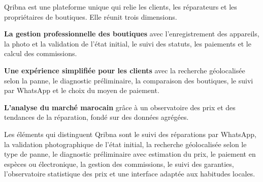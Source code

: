 
Qribna est une plateforme unique qui relie les clients, les réparateurs et les propriétaires de boutiques. Elle réunit trois dimensions.

\begin{cdcitems}
  \item \textbf{La gestion professionnelle des boutiques} avec l’enregistrement des appareils, la photo et la validation de l’état initial, le suivi des statuts, les paiements et le calcul des commissions.
  \item \textbf{Une expérience simplifiée pour les clients} avec la recherche géolocalisée selon la panne, le diagnostic préliminaire, la comparaison des boutiques, le suivi par WhatsApp et le choix du moyen de paiement.
  \item \textbf{L’analyse du marché marocain} grâce à un observatoire des prix et des tendances de la réparation, fondé sur des données agrégées.
\end{cdcitems}

Les éléments qui distinguent Qribna sont le suivi des réparations par WhatsApp, la validation photographique de l’état initial, la recherche géolocalisée selon le type de panne, le diagnostic préliminaire avec estimation du prix, le paiement en espèces ou électronique, la gestion des commissions, le suivi des garanties, l’observatoire statistique des prix et une interface adaptée aux habitudes locales.
